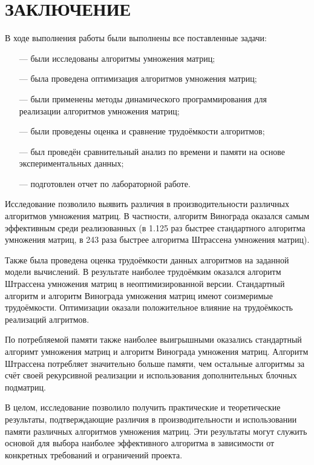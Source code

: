 \chapter*{ЗАКЛЮЧЕНИЕ}

В ходе выполнения работы были выполнены все поставленные задачи:
\begin{itemize}
	\item[---] были исследованы алгоритмы умножения матриц;
	\item[---] была проведена оптимизация алгоритмов умножения матриц;
	\item[---] были применены методы динамического программирования для реализации алгоритмов умножения матриц;
	\item[---] были проведены оценка и сравнение трудоёмкости алгоритмов;
	\item[---] был проведён сравнительный анализ по времени и памяти на основе экспериментальных данных;
	\item[---] подготовлен отчет по лабораторной работе.
\end{itemize}

Исследование позволило выявить различия в производительности различных алгоритмов умножения матриц. В частности, алгоритм Винограда оказался самым эффективным среди реализованных (в 1.125 раз быстрее стандартного алгоритма умножения матриц, в 243 раза быстрее алгоритма Штрассена умножения матриц). 

Также была проведена оценка трудоёмкости данных алгоритмов на заданной модели вычислений. В результате наиболее трудоёмким оказался алгоритм Штрассена умножения матриц в неоптимизированной версии. Стандартный алгоритм и алгоритм Винограда умножения матриц имеют соизмеримые трудоёмкости. Оптимизации оказали положительное влияние на трудоёмкость реализаций алгритмов.

По потребляемой памяти также наиболее выигрышными оказались стандартный алгоримт умножения матриц и алгоритм Винограда умножения матриц. Алгоритм Штрассена потребляет значительно больше памяти, чем остальные алгоритмы за счёт своей рекурсивной реализации и использования дополнительных блочных подматриц.

В целом, исследование позволило получить практические и теоретические результаты, подтверждающие различия в производительности и использовании памяти различных алгоритмов умножения матриц. Эти результаты могут служить основой для выбора наиболее эффективного алгоритма в зависимости от конкретных требований и ограничений проекта.
\pagebreak